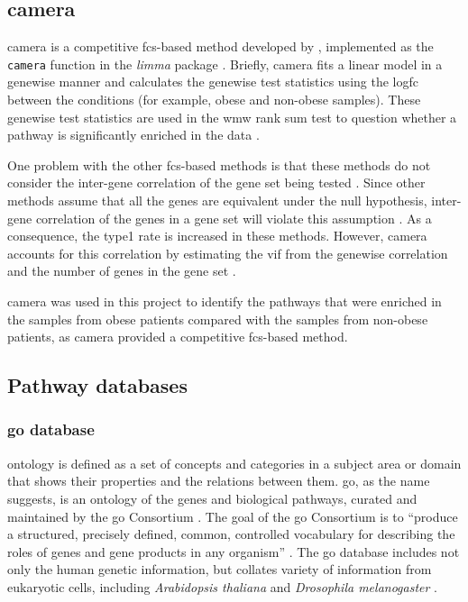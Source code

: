 \subsection{\Gls{camera}}
\label{sub:camera}

\Acrfull{camera} is a competitive \gls{fcs}-based method developed by \citet{Wu2012}, implemented as the \texttt{camera} function in the \textit{limma} package \citep{Ritchie2015}.
Briefly, \gls{camera} fits a linear model in a genewise manner and calculates the genewise test statistics using the log\gls{fc} between the conditions (for example, obese and non-obese samples).
These genewise test statistics are used in the \gls{wmw} rank sum test to question whether a pathway is significantly enriched in the data \citep{Wu2012}.

One problem with the other \gls{fcs}-based methods is that these methods do not consider the inter-gene correlation of the gene set being tested \citep{Wu2012}.
Since other methods assume that all the genes are equivalent under the null hypothesis, inter-gene correlation of the genes in a gene set will violate this assumption \citep{Wu2012}.
As a consequence, the \gls{type1} rate is increased in these methods.
However, \Gls{camera} accounts for this correlation by estimating the \gls{vif} from the genewise correlation and the number of genes in the gene set \citep{Wu2012}.

\gls{camera} was used in this project to identify the pathways that were enriched in the samples from obese patients compared with the samples from non-obese patients, as \gls{camera} provided a competitive \gls{fcs}-based method.

\subsection{Pathway databases}
\label{sub:pathway_databases}

\subsubsection{\gls{go} database}
\label{ssub:go_database}

\Gls{ontology} is defined as a set of concepts and categories in a subject area or domain that shows their properties and the relations between them.
\Acrfull{go}, as the name suggests, is an \gls{ontology} of the genes and biological pathways, curated and maintained by the \gls{go} Consortium \citep{GO2000,GO2004}.
The goal of the \gls{go} Consortium is to ``produce a structured, precisely defined, common, controlled vocabulary for describing the roles of genes and gene products in any organism'' \citep{GO2000}.
The \gls{go} database includes not only the human genetic information, but collates variety of information from eukaryotic cells, including \textit{Arabidopsis thaliana} and \textit{Drosophila melanogaster} \citep{GO2000,GO2004}.

